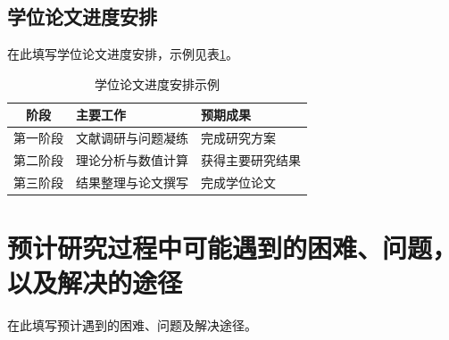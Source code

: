 \documentclass[UTF8,fontset=none,zihao=-4,linespread=1,a4paper]{ctexart}
\begin{document}
\subsection{学位论文进度安排}
在此填写学位论文进度安排，示例见表\ref{tab:schedule}。

\begin{table}[htbp]
  \centering
  \caption{学位论文进度安排示例}
  \label{tab:schedule}
  \begin{tabularx}{0.9\linewidth}{c X X}
    \toprule
    阶段 & 主要工作 & 预期成果 \\
    \midrule
    第一阶段 & 文献调研与问题凝练 & 完成研究方案 \\
    第二阶段 & 理论分析与数值计算 & 获得主要研究结果 \\
    第三阶段 & 结果整理与论文撰写 & 完成学位论文 \\
    \bottomrule
  \end{tabularx}
\end{table}

\section{预计研究过程中可能遇到的困难、问题，以及解决的途径}
在此填写预计遇到的困难、问题及解决途径。



\end{document}
